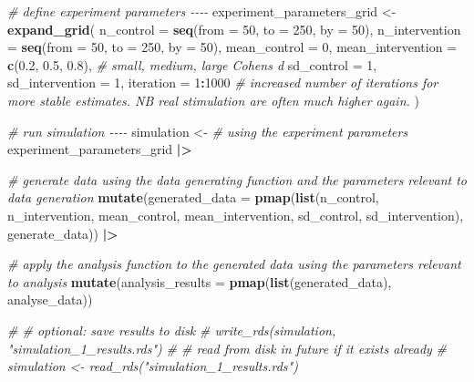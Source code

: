 \documentclass[
]{article}
\newenvironment{Shaded}{\begin{snugshade}}{\end{snugshade}}
\newcommand{\AttributeTok}[1]{\textcolor[rgb]{0.13,0.29,0.53}{#1}}
\newcommand{\CommentTok}[1]{\textcolor[rgb]{0.56,0.35,0.01}{\textit{#1}}}
\newcommand{\DecValTok}[1]{\textcolor[rgb]{0.00,0.00,0.81}{#1}}
\newcommand{\FloatTok}[1]{\textcolor[rgb]{0.00,0.00,0.81}{#1}}
\newcommand{\FunctionTok}[1]{\textcolor[rgb]{0.13,0.29,0.53}{\textbf{#1}}}
\newcommand{\NormalTok}[1]{#1}
\newcommand{\OtherTok}[1]{\textcolor[rgb]{0.56,0.35,0.01}{#1}}
\newcommand{\SpecialCharTok}[1]{\textcolor[rgb]{0.81,0.36,0.00}{\textbf{#1}}}
\begin{document}
\begin{Shaded}
\begin{Highlighting}[]
\CommentTok{\# define experiment parameters {-}{-}{-}{-}}
\NormalTok{experiment\_parameters\_grid }\OtherTok{\textless{}{-}} \FunctionTok{expand\_grid}\NormalTok{(}
  \AttributeTok{n\_control =} \FunctionTok{seq}\NormalTok{(}\AttributeTok{from =} \DecValTok{50}\NormalTok{, }\AttributeTok{to =} \DecValTok{250}\NormalTok{, }\AttributeTok{by =} \DecValTok{50}\NormalTok{),}
  \AttributeTok{n\_intervention =} \FunctionTok{seq}\NormalTok{(}\AttributeTok{from =} \DecValTok{50}\NormalTok{, }\AttributeTok{to =} \DecValTok{250}\NormalTok{, }\AttributeTok{by =} \DecValTok{50}\NormalTok{),}
  \AttributeTok{mean\_control =} \DecValTok{0}\NormalTok{,}
  \AttributeTok{mean\_intervention =} \FunctionTok{c}\NormalTok{(}\FloatTok{0.2}\NormalTok{, }\FloatTok{0.5}\NormalTok{, }\FloatTok{0.8}\NormalTok{), }\CommentTok{\# small, medium, large Cohen\textquotesingle{}s d}
  \AttributeTok{sd\_control =} \DecValTok{1}\NormalTok{,}
  \AttributeTok{sd\_intervention =} \DecValTok{1}\NormalTok{,}
  \AttributeTok{iteration =} \DecValTok{1}\SpecialCharTok{:}\DecValTok{1000} \CommentTok{\# increased number of iterations for more stable estimates. NB real stimulation are often much higher again.}
\NormalTok{)}


\CommentTok{\# run simulation {-}{-}{-}{-}}
\NormalTok{simulation }\OtherTok{\textless{}{-}} 
  \CommentTok{\# using the experiment parameters}
\NormalTok{  experiment\_parameters\_grid }\SpecialCharTok{|\textgreater{}}
  
  \CommentTok{\# generate data using the data generating function and the parameters relevant to data generation}
  \FunctionTok{mutate}\NormalTok{(}\AttributeTok{generated\_data =} \FunctionTok{pmap}\NormalTok{(}\FunctionTok{list}\NormalTok{(n\_control,}
\NormalTok{                                    n\_intervention,}
\NormalTok{                                    mean\_control,}
\NormalTok{                                    mean\_intervention,}
\NormalTok{                                    sd\_control,}
\NormalTok{                                    sd\_intervention),}
\NormalTok{                               generate\_data)) }\SpecialCharTok{|\textgreater{}}
  
  \CommentTok{\# apply the analysis function to the generated data using the parameters relevant to analysis}
  \FunctionTok{mutate}\NormalTok{(}\AttributeTok{analysis\_results =} \FunctionTok{pmap}\NormalTok{(}\FunctionTok{list}\NormalTok{(generated\_data),}
\NormalTok{                                 analyse\_data))}
  

\CommentTok{\# \# optional: save results to disk}
\CommentTok{\# write\_rds(simulation, "simulation\_1\_results.rds")}
\CommentTok{\# \# read from disk in future if it exists already}
\CommentTok{\# simulation \textless{}{-} read\_rds("simulation\_1\_results.rds")}



\end{Highlighting}
\end{Shaded}
\end{document}
